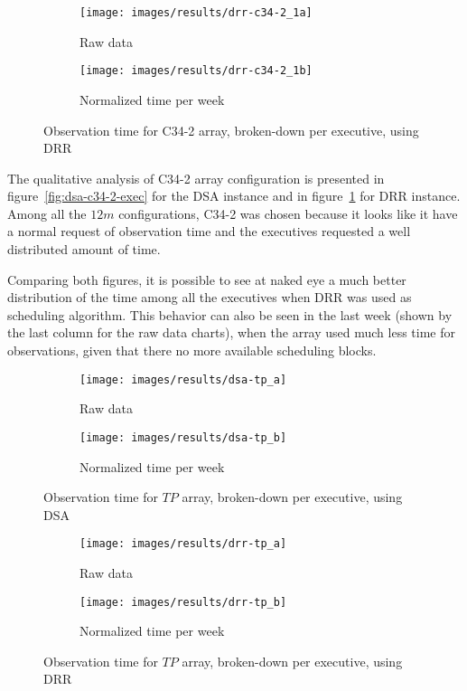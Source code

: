 \begin{figure}[t]
\centering
	\begin{subfigure}[b]{0.49\textwidth}
		\texttt{[image: images/results/drr-c34-2\_1a]}
        \caption{Raw data} 
    \end{subfigure} 
    \begin{subfigure}[b]{0.49\textwidth}
    		\texttt{[image: images/results/drr-c34-2\_1b]}
            \caption{Normalized time per week} 
    \end{subfigure}
    \caption{Observation time for C34-2 array, broken-down per executive, using DRR}
    \label{fig:drr-c34-2-exec}
\end{figure}

The qualitative analysis of C34-2 array configuration is presented in figure~\ref{fig:dsa-c34-2-exec} for the DSA instance and in figure~\ref{fig:drr-c34-2-exec} for DRR instance. Among all the $12m$ configurations, C34-2 was chosen because it looks like it have a normal request of observation time and the executives requested a well distributed amount of time. 

Comparing both figures, it is possible to see at naked eye a much better distribution of the time among all the executives when DRR was used as scheduling algorithm. This behavior can also be seen in the last week (shown by the last column for the raw data charts), when the array used much less time for observations, given that there no more available scheduling blocks.

\begin{figure}[t]
\centering
	\begin{subfigure}[b]{0.49\textwidth}
		\texttt{[image: images/results/dsa-tp\_a]}
        \caption{Raw data} 
    \end{subfigure} 
    \begin{subfigure}[b]{0.49\textwidth}
    		\texttt{[image: images/results/dsa-tp\_b]}
            \caption{Normalized time per week} 
    \end{subfigure}
    \caption{Observation time for $TP$ array, broken-down per executive, using DSA}
    \label{fig:dsa-tp-exec}
\end{figure}

\begin{figure}[t]
\centering
	\begin{subfigure}[b]{0.49\textwidth}
		\texttt{[image: images/results/drr-tp\_a]}
        \caption{Raw data} 
    \end{subfigure} 
    \begin{subfigure}[b]{0.49\textwidth}
    		\texttt{[image: images/results/drr-tp\_b]}
            \caption{Normalized time per week} 
    \end{subfigure}
    \caption{Observation time for $TP$ array, broken-down per executive, using DRR}
    \label{fig:drr-tp-exec}
\end{figure}

